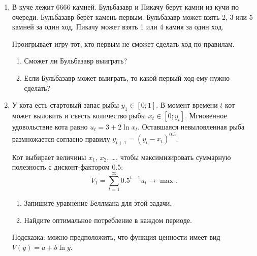 \documentclass[12pt]{article}
\begin{document}
\begin{enumerate}
    \item 
        В куче лежит 6666 камней.
        Бульбазавр и Пикачу берут камни из кучи по очереди.
        Бульбазавр берёт камень первым.
        Бульбазавр может взять 2, 3 или 5 камней за один ход.
        Пикачу может взять 1 или 4 камня за один ход.
        
        Проигрывает игру тот, кто первым не сможет сделать ход по правилам.
        \begin{enumerate}
         \item Сможет ли Бульбазавр выиграть?
         \item Если Бульбазавр может выиграть, то какой первый ход ему нужно сделать?
        \end{enumerate}
    \item У кота есть стартовый запас рыбы $y_1 \in [0;1]$.
    В момент времени $t$ кот может выловить и съесть количество рыбы $x_t \in [0; y_t]$.
    Мгновенное удовольствие кота равно $u_t = 3 + 2\ln x_t$.
    Оставшаяся невыловленная рыба размножается согласно правилу $y_{t+1} = (y_t - x_t)^{0.5}$.

    Кот выбирает величины $x_1$, $x_2$, \ldots, чтобы максимизировать 
    суммарную полезность с дисконт-фактором $0.5$:
    \[
     V_1 = \sum_{t=1}^{\infty} 0.5^{t-1} u_t \to \max.
    \]

    \begin{enumerate}
        \item Запишите уравнение Беллмана для этой задачи. 
        \item Найдите оптимальное потребление в каждом периоде. 
    \end{enumerate}
    
 
 
    Подсказка: можно предположить, что функция ценности имеет вид $V(y) = a + b \ln y$.


\end{enumerate}


\newpage
\end{document}
